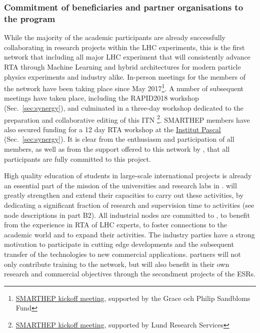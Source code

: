 \subsubsection{Commitment of beneficiaries and partner organisations to the program}

While the majority of the \acronym academic participants are already successfully collaborating in research projects within the LHC experiments, this is the first network that including all major LHC experiment that will consistently advance RTA through Machine Learning and hybrid architectures for modern particle physics experiments and industry alike. 
In-person meetings for the members of the \acronym network have been taking place since May 2017\footnote{\href{https://indico.lucas.lu.se/event/656/}{SMARTHEP kickoff meeting}, supported by the Grace och Philip Sandbloms Fund}. A number of subsequent meetings have taken place, including the RAPID2018 workshop (Sec.~\ref{sec:synergy}), and culminated in a three-day workshop dedicated to the preparation and collaborative editing of this ITN \footnote{\href{https://indico.lucas.lu.se/event/656/}{SMARTHEP kickoff meeting}, supported by Lund Research Services}. SMARTHEP members have also secured funding for a 12 day RTA workshop at the \href{https://www.universite-paris-saclay.fr/en/institut-pascal}{Institut Pascal} (Sec.~\ref{sec:synergy}).
It is clear from the enthusiasm and participation of all members, as well as from the support offered to this network by \lundentity, that all \acronym participants are fully committed to this project.

High quality education of students in large-scale international projects is already an essential part of the mission of the universities and research labs in \acronym. 
\acronym will greatly strengthen and extend their capacities to carry out these activities, by dedicating a significant fraction of research and supervision time to \acronym activities (see node descriptions in part B2).
All industrial nodes are committed to \acronym, to benefit from the experience in RTA of LHC experts, to foster connections to the academic world and to expand their activities. 
The industry parties have a strong motivation to participate in cutting edge developments and the subsequent transfer of the technologies to new commercial applications.
\acronym partners will not only contribute training to the network, but will also benefit in their own research and commercial objectives through the secondment projects of the ESRs. 

